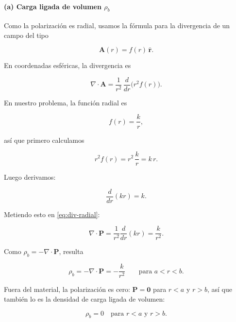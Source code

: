 \documentclass{article}
\begin{document}
\paragraph{(a) Carga ligada de volumen $\rho_{b}$}

Como la polarización es radial, usamos la fórmula para la divergencia de un
campo del tipo

\[
\mathbf{A}(r) = f(r)\,\hat{\mathbf{r}}.
\]

En coordenadas esféricas, la divergencia es

\begin{equation}
\nabla\cdot\mathbf{A} = \frac{1}{r^{2}}\,\frac{d}{dr}\bigl(r^{2} f(r)\bigr).
\label{eq:div-radial}
\end{equation}

En nuestro problema, la función radial es

\[
f(r)=\frac{k}{r},
\]

así que primero calculamos

\begin{equation}
r^{2}f(r) = r^{2}\,\frac{k}{r} = k\,r.
\label{eq:r2f}
\end{equation}

Luego derivamos:

\[
\frac{d}{dr}(kr) = k.
\]

Metiendo esto en \eqref{eq:div-radial}:

\begin{equation}
\nabla\cdot\mathbf{P}
= \frac{1}{r^{2}}\frac{d}{dr}(kr)
= \frac{k}{r^{2}}.
\label{eq:div-P-shell}
\end{equation}

Como $\rho_{b}=-\nabla\cdot\mathbf{P}$, resulta

\begin{equation}
\rho_{b} = -\nabla\cdot\mathbf{P}
= -\frac{k}{r^{2}}
\qquad\text{para } a<r<b.
\label{eq:rho-b-shell}
\end{equation}

Fuera del material, la polarización es cero:
$\mathbf{P}=\mathbf{0}$ para $r<a$ y $r>b$, así que también lo es la
densidad de carga ligada de volumen:

\begin{equation}
\rho_{b} = 0 \quad \text{para } r<a \text{ y } r>b.
\label{eq:rho-b-cero-fuera}
\end{equation}

\end{document}
